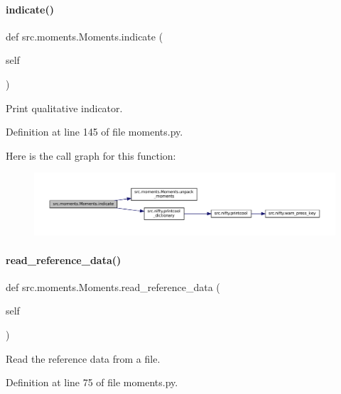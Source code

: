 \paragraph{\texorpdfstring{indicate()}{indicate()}}
{\footnotesize\ttfamily def src.\+moments.\+Moments.\+indicate (\begin{DoxyParamCaption}\item[{}]{self }\end{DoxyParamCaption})}



Print qualitative indicator. 



Definition at line 145 of file moments.\+py.

Here is the call graph for this function\+:
\nopagebreak
\begin{figure}[H]
\begin{center}
\leavevmode
\includegraphics[width=350pt]{classsrc_1_1moments_1_1Moments_ac12f3ed1e870ec611264267f391752be_cgraph}
\end{center}
\end{figure}
\mbox{\label{classsrc_1_1moments_1_1Moments_a3801c9b06ff63421d27ef6119ead1854}} 
\paragraph{\texorpdfstring{read\+\_\+reference\+\_\+data()}{read\_reference\_data()}}
{\footnotesize\ttfamily def src.\+moments.\+Moments.\+read\+\_\+reference\+\_\+data (\begin{DoxyParamCaption}\item[{}]{self }\end{DoxyParamCaption})}



Read the reference data from a file. 



Definition at line 75 of file moments.\+py.

